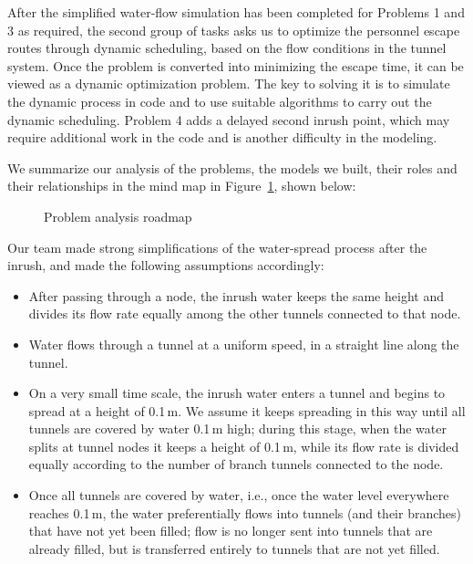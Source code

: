 \documentclass[12pt,a4paper]{article}
\makeatletter
\renewcommand{\section}{\@startsection{section}{1}{\z@}{2.5ex \@plus 1ex}{1.5ex}{\centering\Large\bfseries}}
\makeatother
\begin{document}
After the simplified water-flow simulation has been completed for Problems 1 and 3 as required, the second group of tasks asks us to optimize the personnel escape routes through dynamic scheduling, based on the flow conditions in the tunnel system. Once the problem is converted into minimizing the escape time, it can be viewed as a dynamic optimization problem. The key to solving it is to simulate the dynamic process in code and to use suitable algorithms to carry out the dynamic scheduling. Problem 4 adds a delayed second inrush point, which may require additional work in the code and is another difficulty in the modeling.

We summarize our analysis of the problems, the models we built, their roles and their relationships in the mind map in Figure~\ref{fig:mindmap}, shown below:

\begin{figure}[htbp]
  \centering
  \resizebox{\textwidth}{!}{}
  \caption{Problem analysis roadmap}
  \label{fig:mindmap}
\end{figure}

\section{Model Assumptions}

Our team made strong simplifications of the water-spread process after the inrush, and made the following assumptions accordingly:
\begin{itemize}[leftmargin=2em]
  \item After passing through a node, the inrush water keeps the same height and divides its flow rate equally among the other tunnels connected to that node.
  \item Water flows through a tunnel at a uniform speed, in a straight line along the tunnel.
  \item On a very small time scale, the inrush water enters a tunnel and begins to spread at a height of 0.1\,m. We assume it keeps spreading in this way until all tunnels are covered by water 0.1\,m high; during this stage, when the water splits at tunnel nodes it keeps a height of 0.1\,m, while its flow rate is divided equally according to the number of branch tunnels connected to the node.
  \item Once all tunnels are covered by water, i.e., once the water level everywhere reaches 0.1\,m, the water preferentially flows into tunnels (and their branches) that have not yet been filled; flow is no longer sent into tunnels that are already filled, but is transferred entirely to tunnels that are not yet filled.
\end{itemize}
\end{document}
